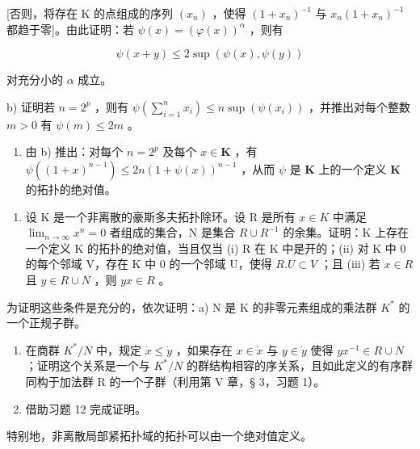 {[}否则，将存在 K 的点组成的序列 \((x_{n})\) ，使得 \((1 + x_n)^{-1}\) 与 \(x_{n}(1 + x_{n})^{-1}\) 都趋于零{]}。由此证明：若 \(\psi (x) = (\varphi (x))^{\alpha}\) ，则有

\[
\psi (x + y) \leqslant 2 \sup (\psi (x), \psi (y))
\]

对充分小的 \(\alpha\) 成立。

b) 证明若 \(n = 2^p\) ，则有 \(\psi\left(\sum_{i=1}^{n} x_i\right) \leqslant n \sup (\psi(x_i))\) ，并推出对每个整数 \(m > 0\) 有 \(\psi(m) \leqslant 2m\) 。

\begin{enumerate}
\def\labelenumi{\alph{enumi})}
\setcounter{enumi}{2}
\tightlist
\item
  由 b) 推出：对每个 \(n = 2^p\) 及每个 \(x \in \mathbf{K}\) ，有 \(\psi((1 + x)^{n-1}) \leqslant 2n(1 + \psi(x))^{n-1}\) ，从而 \(\psi\) 是 \(\mathbf{K}\) 上的一个定义 \(\mathbf{K}\) 的拓扑的绝对值。
\end{enumerate}

\begin{enumerate}
\def\labelenumi{\arabic{enumi})}
\setcounter{enumi}{12}
\tightlist
\item
  设 K 是一个非离散的豪斯多夫拓扑除环。设 R 是所有 \(x \in K\) 中满足 \(\lim_{n \to \infty} x^n = 0\) 者组成的集合，N 是集合 \(R \cup R^{-1}\) 的余集。证明：K 上存在一个定义 K 的拓扑的绝对值，当且仅当 (i) R 在 K 中是开的；(ii) 对 K 中 0 的每个邻域 V，存在 K 中 0 的一个邻域 U，使得 \(R.U \subset V\) ；且 (iii) 若 \(x \in R\) 且 \(y \in R \cup N\) ，则 \(yx \in R\) 。
\end{enumerate}

为证明这些条件是充分的，依次证明：a) N 是 K 的非零元素组成的乘法群 \(K^{*}\) 的一个正规子群。

\begin{enumerate}
\def\labelenumi{\alph{enumi})}
\setcounter{enumi}{1}
\item
  在商群 \(K^{*}/N\) 中，规定 \(\dot{x} \leqslant \dot{y}\) ，如果存在 \(x \in \dot{x}\) 与 \(y \in \dot{y}\) 使得 \(yx^{-1} \in R \cup N\) ；证明这个关系是一个与 \(K^{*}/N\) 的群结构相容的序关系，且如此定义的有序群同构于加法群 R 的一个子群（利用第 V 章，§ 3，习题 1）。
\item
  借助习题 12 完成证明。
\end{enumerate}

特别地，非离散局部紧拓扑域的拓扑可以由一个绝对值定义。

